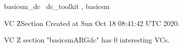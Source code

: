 \documentclass{article}
\begin{document}

\begin{zsection}	 \SECTION basicsm\_dc \parents~dc\_toolkit , basicsm
\end{zsection}

\newcommand{\appliesTo}{\zbinop{appliesTo}} 
\newcommand{\appliesToNofix}{\zpreop{appliesToNofix}} 

VC ZSection Created at Sun Oct 18 08:41:42 UTC 2020.



 VC Z section "basicsmARGdc" has $0$ interesting VCs.



\end{document}
